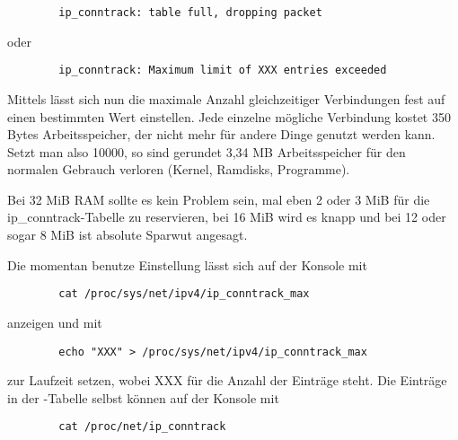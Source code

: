 \begin{description}
    \begin{example}
      \begin{verbatim}
        ip_conntrack: table full, dropping packet
      \end{verbatim}
    \end{example}
   
   oder
   
   \begin{example}
      \begin{verbatim}
        ip_conntrack: Maximum limit of XXX entries exceeded
      \end{verbatim}
    \end{example}

    Mittels  lässt sich nun die maximale
    Anzahl gleichzeitiger Verbindungen fest auf einen bestimmten Wert
    einstellen. Jede einzelne mögliche Verbindung kostet 350 Bytes Arbeitsspeicher, 
    der nicht mehr für andere Dinge genutzt werden kann.
    Setzt man also 10000, so sind gerundet 3,34 MB Arbeitsspeicher für den
    normalen Gebrauch verloren (Kernel, Ramdisks, Programme).

    Bei 32 MiB RAM sollte es kein Problem sein, mal eben 2 oder 3 MiB für die
    ip\_conntrack-Tabelle zu reservieren, bei 16 MiB wird es knapp und bei 12
    oder sogar 8 MiB ist absolute Sparwut angesagt.

    Die momentan benutze Einstellung lässt sich auf der Konsole mit

    \begin{example}
      \begin{verbatim}
        cat /proc/sys/net/ipv4/ip_conntrack_max
      \end{verbatim}
    \end{example}

    anzeigen und mit

    \begin{example}
      \begin{verbatim}
        echo "XXX" > /proc/sys/net/ipv4/ip_conntrack_max
      \end{verbatim}
    \end{example}

    zur Laufzeit setzen, wobei XXX für die Anzahl der Einträge steht.
    Die Einträge in der -Tabelle selbst können auf der Konsole
    mit

    \begin{example}
      \begin{verbatim}
        cat /proc/net/ip_conntrack
      \end{verbatim}
    \end{example}


\end{description}

